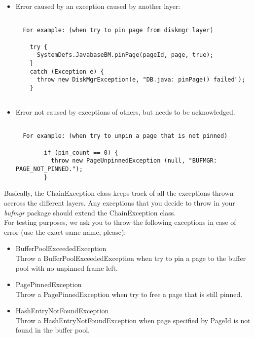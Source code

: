 \begin{itemize}

\item Error caused by an exception caused by another layer: \\

\begin{verbatim}

  For example: (when try to pin page from diskmgr layer)

    try {
      SystemDefs.JavabaseBM.pinPage(pageId, page, true);
    }
    catch (Exception e) {
      throw new DiskMgrException(e, "DB.java: pinPage() failed");
    }


\end{verbatim}


\item Error not caused by exceptions of others, but needs to be
      acknowledged.

\begin{verbatim}

  For example: (when try to unpin a page that is not pinned)

        if (pin_count == 0) {
          throw new PageUnpinnedException (null, "BUFMGR: PAGE_NOT_PINNED.");
        }

\end{verbatim}
\end{itemize}


Basically, the ChainException class keeps track of all the exceptions 
thrown accross the different layers.  Any exceptions that you decide
to throw in your {\em bufmgr} package should extend the ChainException
class. \\

For testing purposes, we ask you to throw the following exceptions
in case of error (use the exact same name, please):
\begin{itemize}
\item BufferPoolExceededException \\
      Throw a BufferPoolExceededException when try to pin
      a page to the buffer pool with no unpinned frame left.

\item PagePinnedException \\
      Throw a PagePinnedException when try to free a page that
      is still pinned.
      
\item HashEntryNotFoundException \\
      Throw a HashEntryNotFoundException when page specified by
      PageId is not found in the buffer pool.
\end{itemize}

